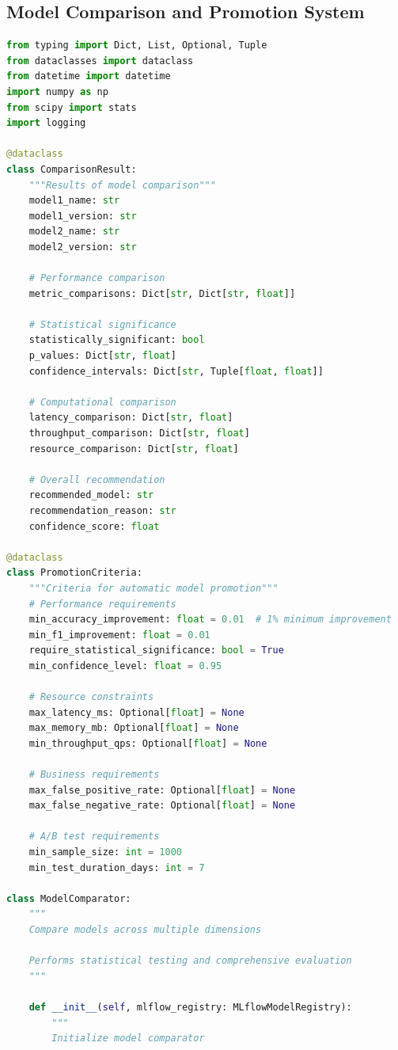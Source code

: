\subsection{Model Comparison and Promotion System}

\begin{lstlisting}[language=Python, caption=Model Comparison and Promotion System]
from typing import Dict, List, Optional, Tuple
from dataclasses import dataclass
from datetime import datetime
import numpy as np
from scipy import stats
import logging

@dataclass
class ComparisonResult:
    """Results of model comparison"""
    model1_name: str
    model1_version: str
    model2_name: str
    model2_version: str

    # Performance comparison
    metric_comparisons: Dict[str, Dict[str, float]]

    # Statistical significance
    statistically_significant: bool
    p_values: Dict[str, float]
    confidence_intervals: Dict[str, Tuple[float, float]]

    # Computational comparison
    latency_comparison: Dict[str, float]
    throughput_comparison: Dict[str, float]
    resource_comparison: Dict[str, float]

    # Overall recommendation
    recommended_model: str
    recommendation_reason: str
    confidence_score: float

@dataclass
class PromotionCriteria:
    """Criteria for automatic model promotion"""
    # Performance requirements
    min_accuracy_improvement: float = 0.01  # 1% minimum improvement
    min_f1_improvement: float = 0.01
    require_statistical_significance: bool = True
    min_confidence_level: float = 0.95

    # Resource constraints
    max_latency_ms: Optional[float] = None
    max_memory_mb: Optional[float] = None
    min_throughput_qps: Optional[float] = None

    # Business requirements
    max_false_positive_rate: Optional[float] = None
    max_false_negative_rate: Optional[float] = None

    # A/B test requirements
    min_sample_size: int = 1000
    min_test_duration_days: int = 7

class ModelComparator:
    """
    Compare models across multiple dimensions

    Performs statistical testing and comprehensive evaluation
    """

    def __init__(self, mlflow_registry: MLflowModelRegistry):
        """
        Initialize model comparator


\end{lstlisting}
